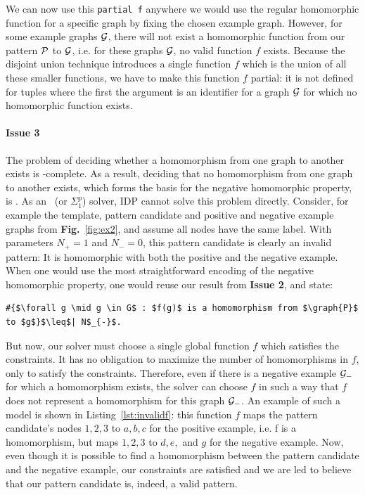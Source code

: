 We can now use this \verb|partial f| anywhere we would use the regular homomorphic function for a specific graph by fixing the chosen example graph.
However, for some example graphs $\mathcal{G}$, there will not exist a homomorphic function from our pattern $\mathcal{P}$ to $\mathcal{G}$, i.e. for these graphs $\mathcal{G}$, no valid function $f$ exists.
Because the disjoint union technique introduces a single function $f$ which is the union of all these smaller functions, we have to make this function $f$ partial: it is not defined for tuples where the first the argument is an identifier for a graph $\mathcal{G}$ for which no homomorphic function exists.




\paragraph{Issue 3} The problem of deciding whether a homomorphism from one graph to another exists is \NP-complete.
As a result, deciding that no homomorphism from one graph to another exists, which forms the basis for the negative homomorphic property, is \coNP.
As an \NP\ (or $\Sigma^{p}_{1}$) solver, IDP cannot solve this problem directly.
Consider, for example the template, pattern candidate and positive and negative example graphs from \textbf{Fig.}~\ref{fig:ex2}, and assume all nodes have the same label.
With parameters $N_{+}=1$ and $N_{-}=0$, this pattern candidate is clearly an invalid pattern: It is homomorphic with both the positive and the negative example.
When one would use the most straightforward encoding of the negative homomorphic property, one would reuse our result from \textbf{Issue 2}, and state:
\begin{center}
\begin{minipage}{0.61\linewidth}
\begin{lstlisting}[mathescape]
#{$\forall g \mid g \in G$ : $f(g)$ is a homomorphism from $\graph{P}$ to $g$}$\leq$| N$_{-}$.
\end{lstlisting}
\end{minipage}
\end{center}
But now, our solver must choose a single global function $f$ which satisfies the constraints.
It has no obligation to maximize the number of homomorphisms in $f$, only to satisfy the constraints.
Therefore, even if there is a negative example $\mathcal{G}_{-}$ for which a homomorphism exists, the solver can choose $f$ in such a way that $f$ does not represent a homomorphism for this graph $\mathcal{G}_{-}$.
An example of such a model is shown in Listing~\ref{lst:invalidf}: this function $f$ maps the pattern candidate's nodes $1, 2, 3$ to $a, b, c$ for the positive example, i.e. f is a homomorphism, but maps $1, 2, 3$ to $d, e,$ and $g$ for the negative example.
Now, even though it is possible to find a homomorphism between the pattern candidate and the negative example, our constraints are satisfied and we are led to believe that our pattern candidate is, indeed, a valid pattern.


